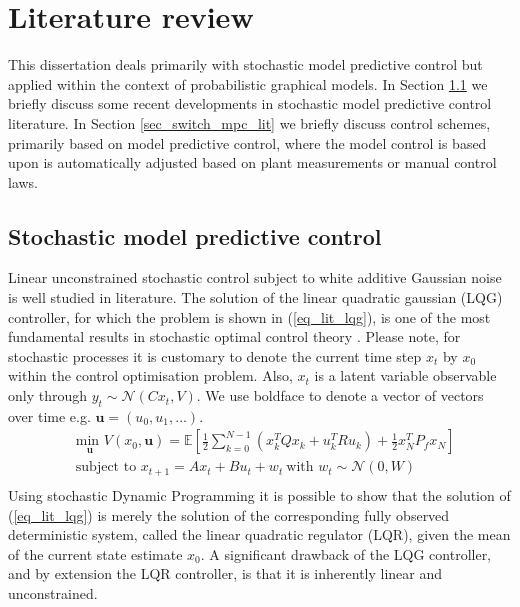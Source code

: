 \chapter{Literature review}
\label{sec_lit_study}
This dissertation deals primarily with stochastic model predictive control but applied within the context of probabilistic graphical models. In Section \ref{sec_stoch_mpc_lit} we briefly discuss some recent developments in stochastic model predictive control literature. In Section \ref{sec_switch_mpc_lit} we briefly discuss control schemes, primarily  based on model predictive control, where the model control is based upon is automatically adjusted based on plant measurements or manual control laws.

\section{Stochastic model predictive control}
\label{sec_stoch_mpc_lit}
Linear unconstrained stochastic control subject to white additive Gaussian noise is well studied in literature. The solution of the linear quadratic gaussian (LQG) controller, for which the problem is shown in (\ref{eq_lit_lqg}), is one of the most fundamental results in stochastic optimal control theory \cite{lqg}. Please note, for stochastic processes it is customary to denote the current time step $x_t$ by $x_0$ within the control optimisation problem. Also, $x_t$ is a latent variable observable only through $y_t \sim \mathcal{N}(Cx_t, V)$. We use boldface to denote a vector of vectors over time e.g. $\mathbf{u}=(u_0, u_1,...)$.
\begin{equation}
\begin{aligned}
&\underset{\mathbf{u}}{\text{min }} V(x_0, \mathbf{u}) = \mathbb{E}\left[ \frac{1}{2}\sum_{k=0}^{N-1} \left( x_k^TQx_k + u_k^TRu_k \right) + \frac{1}{2}x_N^TP_fx_N \right] \\
& \text{subject to } x_{t+1}=Ax_t+Bu_t + w_t~\text{with } w_t \sim \mathcal{N}(0, W) \\
\end{aligned}
\label{eq_lit_lqg}
\end{equation}
Using stochastic Dynamic Programming it is possible to show that the solution of (\ref{eq_lit_lqg}) is merely the solution of the corresponding fully observed deterministic system, called the linear quadratic regulator (LQR), given the mean of the current state estimate $x_0$. A significant drawback of the LQG controller, and by extension the LQR controller, is that it is inherently linear and unconstrained.

